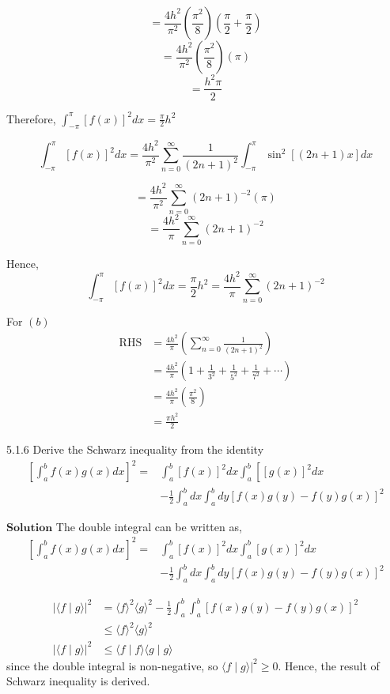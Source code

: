 \documentclass{article}
\begin{document}
\begin{flushleft}
$$=\frac{4 h^{2}}{\pi^{2}}\left(\frac{\pi^{2}}{8}\right)\left(\frac{\pi}{2}+\frac{\pi}{2}\right)$$
$$=\frac{4 h^{2}}{\pi^{2}}\left(\frac{\pi^{2}}{8}\right)(\pi)$$
$$=\frac{h^{2} \pi}{2}$$


Therefore, $\int_{-\pi}^{\pi}[f(x)]^{2} d x=\frac{\pi}{2} h^{2}$

$$
\int_{-\pi}^{\pi}[f(x)]^{2} d x=\frac{4 h^{2}}{\pi^{2}} \sum_{n=0}^{\infty} \frac{1}{(2 n+1)^{2}} \int_{-\pi}^{\pi} \sin ^{2}[(2 n+1) x] d x
$$

$$=\frac{4 h^{2}}{\pi^{2}} \sum_{n=0}^{\infty}(2 n+1)^{-2}(\pi)$$
$$=\frac{4 h^{2}}{\pi} \sum_{n=0}^{\infty}(2 n+1)^{-2}$$

Hence, $$\int_{-\pi}^{\pi}[f(x)]^{2} d x=\frac{\pi}{2} h^{2}=\frac{4 h^{2}}{\pi} \sum_{n=0}^{\infty}(2 n+1)^{-2}$$


For $(b)$ $$
\begin{aligned}
\mathrm{RHS} &=\frac{4 h^{2}}{\pi}\left(\sum_{n=0}^{\infty} \frac{1}{(2 n+1)^{2}}\right) \\
&=\frac{4 h^{2}}{\pi}\left(1+\frac{1}{3^{2}}+\frac{1}{5^{2}}+\frac{1}{7^{2}}+\cdots\right) \\
&=\frac{4 h^{2}}{\pi}\left(\frac{\pi^{2}}{8}\right) \\
&=\frac{\pi h^{2}}{2}
\end{aligned}
$$

\newpage


\begin{mybox}{5.1.6}
Derive the Schwarz inequality from the identity
$$
\begin{aligned}
\left[\int_{a}^{b} f(x) g(x) d x\right]^{2}=& \int_{a}^{b}[f(x)]^{2} d x \int_{a}^{b}\left[[g(x)]^{2} d x\right.\\
&-\frac{1}{2} \int_{a}^{b} d x \int_{a}^{b} d y[f(x) g(y)-f(y) g(x)]^{2}
\end{aligned}
$$
\end{mybox}

$\boxed{\textbf{Solution}}$ The double integral can be written as,
$$
\begin{aligned}
\left[\int_{a}^{b} f(x) g(x) d x\right]^{2}=& \int_{a}^{b}[f(x)]^{2} d x \int_{a}^{b}[g(x)]^{2} d x \\
&-\frac{1}{2} \int_{a}^{b} d x \int_{a}^{b} d y[f(x) g(y)-f(y) g(x)]^{2}
\end{aligned}
$$

$$
\begin{aligned}
|\langle f \mid g\rangle|^{2} &=\langle f\rangle^{2}\langle g\rangle^{2}-\frac{1}{2} \int_{a}^{b} \int_{a}^{b}[f(x) g(y)-f(y) g(x)]^{2} \\
& \leq\langle f\rangle^{2}\langle g\rangle^{2} \\
|\langle f \mid g\rangle|^{2} & \leq\langle f \mid f\rangle\langle g \mid g\rangle
\end{aligned}
$$
since the double integral is non-negative, so $\left.\langle f \mid g\rangle\right|^{2} \geq 0$.
Hence, the result of Schwarz inequality is derived.


\end{flushleft}
\end{document}
